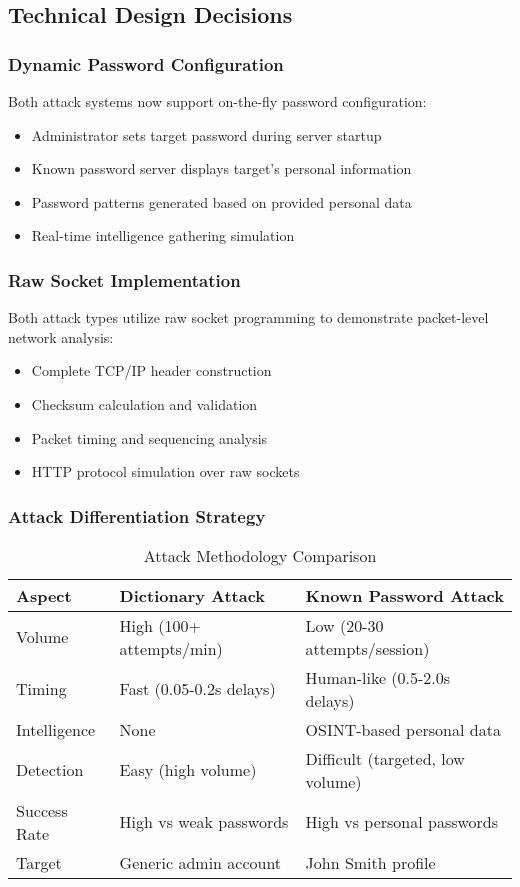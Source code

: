 \documentclass[12pt,a4paper]{article}
\begin{document}
\subsection{Technical Design Decisions}

\subsubsection{Dynamic Password Configuration}
Both attack systems now support on-the-fly password configuration:

\begin{itemize}
    \item Administrator sets target password during server startup
    \item Known password server displays target's personal information
    \item Password patterns generated based on provided personal data
    \item Real-time intelligence gathering simulation
\end{itemize}

\subsubsection{Raw Socket Implementation}
Both attack types utilize raw socket programming to demonstrate packet-level network analysis:

\begin{itemize}
    \item Complete TCP/IP header construction
    \item Checksum calculation and validation
    \item Packet timing and sequencing analysis
    \item HTTP protocol simulation over raw sockets
\end{itemize}

\subsubsection{Attack Differentiation Strategy}

\begin{table}[H]
\centering
\begin{tabular}{|l|l|l|}
\hline
\textbf{Aspect} & \textbf{Dictionary Attack} & \textbf{Known Password Attack} \\
\hline
Volume & High (100+ attempts/min) & Low (20-30 attempts/session) \\
Timing & Fast (0.05-0.2s delays) & Human-like (0.5-2.0s delays) \\
Intelligence & None & OSINT-based personal data \\
Detection & Easy (high volume) & Difficult (targeted, low volume) \\
Success Rate & High vs weak passwords & High vs personal passwords \\
Target & Generic admin account & John Smith profile \\
\hline
\end{tabular}
\caption{Attack Methodology Comparison}
\end{table}
\end{document}
